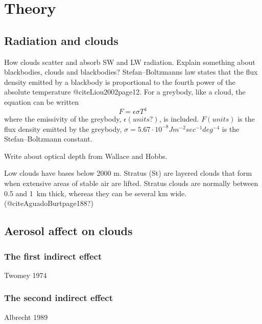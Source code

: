 \chapter{Theory}
\label{chap:theory}
\section{Radiation and clouds}
How clouds scatter and absorb SW and LW radiation.
Explain something about blackbodies, clouds and blackbodies? Stefan–Boltzmanns law states that the flux density emitted by a blackbody is proportional to the fourth power of the absolute temperature @citeLiou2002page12. For a greybody, like a cloud, the equation can be written
\begin{equation}
F = \epsilon \sigma T^4
\end{equation}
where the emissivity of the greybody, $\epsilon(units?)$, is included. $F(units)$ is the flux density emitted by the greybody, $\sigma = 5.67\cdot 10^{-8} Jm^{-2}sec^{-1}deg^{-4}$ is the Stefan–Boltzmann constant.


Write about optical depth from Wallace and Hobbs.

Low clouds have bases below 2000 m. Stratus (St) are layered clouds that form when extensive areas of stable air are lifted. Stratus clouds are normally between 0.5 and 1~km thick, whereas they can be several km wide. (@citeAguadoBurtpage188?)

\section{Aerosol affect on clouds}
\subsection{The first indirect effect}
Twomey 1974
\subsection{The second indirect effect}
Albrecht 1989